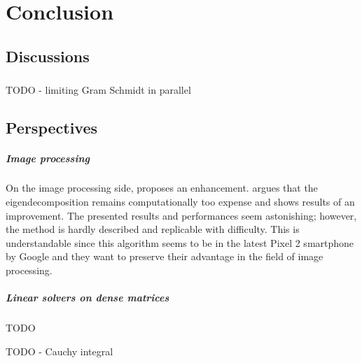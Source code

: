 \chapter{Conclusion}

\section{Discussions}

\paragraph{}
TODO - limiting Gram Schmidt in parallel

\section{Perspectives}

\paragraph{Image processing}
On the image processing side, \cite{talebi_fast_2016} proposes an enhancement.
\cite{talebi_fast_2016} argues that the eigendecomposition remains computationally too expense and shows results of an improvement.
The presented results and performances seem astonishing; however, the method is hardly described and replicable with difficulty.
This is understandable since this algorithm seems to be in the latest Pixel 2 smartphone by Google and they want to preserve their advantage in the field of image processing.

\paragraph{Linear solvers on dense matrices}
TODO

TODO - Cauchy integral
